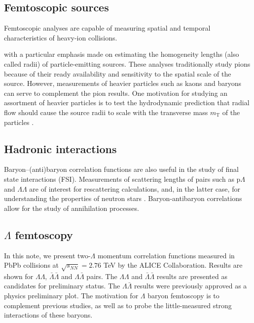\subsection{Femtoscopic sources}

Femtoscopic analyses are capable of measuring spatial and temporal characteristics of heavy-ion collisions.



 with a particular emphasis made on estimating the homogeneity lengths (also called radii) of particle-emitting sources.  
These analyses traditionally study pions \cite{Goldhaber:1960sf,Aamodt:2011mr} because of their ready availability and sensitivity to the spatial scale of the source.  
However, measurements of heavier particles such as kaons \cite{Abelev:2012ms} and baryons \cite{Gos:2007cj} can serve to complement the pion results.  
One motivation for studying an assortment of heavier particles is to test the hydrodynamic prediction that radial flow should cause the source radii to scale with the transverse mass $m_{\mathrm{T}}$ of the particles \cite{Csorgo:1995bi,Lisa:2005dd}.

\subsection{Hadronic interactions}
Baryon--(anti)baryon correlation functions are also useful in the study of final state interactions (FSI).  
Measurements of scattering lengths of pairs such as p$\Lambda$ and $\Lambda\Lambda$ are of interest for rescattering calculations, and, in the latter case, for understanding the properties of neutron stars \cite{SchaffnerBielich:2008kb,Wang:2010gr}.  
Baryon-antibaryon correlations allow for the study of annihilation processes.  

\subsection{$\Lambda$ femtoscopy}
In this note, we present two-$\Lambda$ momentum correlation functions measured in PbPb collisions at $\sqrt{s_{NN}}=2.76$ TeV by the ALICE Collaboration.  
Results are shown for $\Lambda\Lambda$, $\bar{\Lambda}\bar{\Lambda}$ and $\Lambda\bar{\Lambda}$ pairs. 
The $\Lambda\Lambda$ and $\bar{\Lambda}\bar{\Lambda}$ results are presented as candidates for preliminary status. 
The $\Lambda\bar{\Lambda}$ results were previously approved as a physics preliminary plot.  
The motivation for $\Lambda$ baryon femtoscopy is to complement previous studies, as well as to probe the little-measured strong interactions of these baryons.

